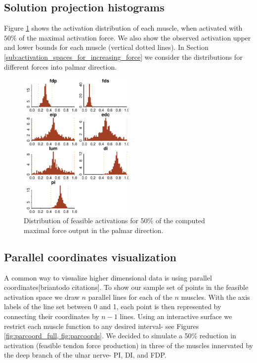 \subsection{Solution projection histograms}
Figure \ref{fig:raw_histograms} shows the activation distribution of each muscle, when activated with $50\%$ of the maximal activation force. We also show the observed activation upper and lower bounds for each muscle (vertical dotted lines).
In Section \ref{sub:activation_spaces_for_increasing_force} we consider the distributions for different forces into palmar direction.
\begin{figure}[!htbp]
\centering
\includegraphics[width=0.5\textwidth]{figs/raw_histograms.pdf}
\caption{Distribution of feasible activations for 50\% of the computed maximal force output in the palmar direction.}
\label{fig:raw_histograms}
\end{figure}

\subsection{Parallel coordinates visualization}
A common way to visualize higher dimensional data is using parallel coordinates[briantodo citations]. To show our sample set of points in the feasible activation space we draw $n$ parallel lines for each of the $n$ muscles.
With the axis labels of the line set between 0 and 1, each point is then represented by connecting their coordinates by $n-1$ lines.
Using an interactive surface we restrict each muscle function to any desired interval- see Figures \ref{fig:parcoord_full, fig:parcoords}.
We decided to simulate a 50\% reduction in activation (feasible tendon force production) in three of the muscles innervated by the deep branch of the ulnar nerve- PI, DI, and FDP. 

